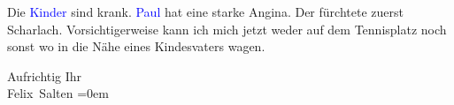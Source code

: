 \pstart
           Die \textcolor{blue}{Kinder}{}\ledrightnote{{$\rightarrow$}\textcolor{blue}{Anna Katharina Rehmann}{\newline}{$\rightarrow$}\textcolor{blue}{Paul Salten}} sind krank. \textcolor{blue}{Paul}{}\ledrightnote{\textcolor{blue}{Paul Salten}} hat eine starke Angina. Der \label{K_L03435-3v}\label{} fürchtete zuerst
               Scharlach. Vorsichtigerweise kann ich mich jetzt weder auf dem Tennisplatz noch sonst
               wo in die Nähe eines Kindesvaters wagen.\pend
           
\pstart
           Aufrichtig Ihr {\\[\baselineskip]}\spacefill\mbox{Felix Salten}\pend
           \leftskip=0em{}\endnumbering{}  
      